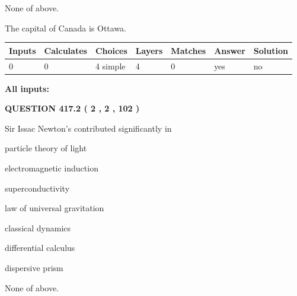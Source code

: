 \documentclass[12pt]{article}
\begin{document}
 
 None of above.
 
 
\noindent{}
 
 
The capital of Canada is Ottawa.
 
 
\noindent{}
 
 
   
   
   
   
\noindent\begin{tabular}{|l|l|l|l|l|l|l|}
 \hline
Inputs & Calculates & Choices & Layers & Matches & Answer & Solution \\ \hline
 0  & 
 0  & 
 4
  simple  
  & 
 4  & 
 0  & 
  yes & 
  no 
  \\ \hline
 \end{tabular}
   
   
   
   
\noindent{}
   
   
   
   
\noindent\vspace{0.1in}\hspace{-0.08in} {\textbf{\Large{All inputs: }}}
   
   
  
\vspace{0.2in}
  
{\textbf{\Large{QUESTION
417.2 
 ( 2 , 2 , 102 )
}}}
  
  
Sir Issac Newton's contributed significantly in
 
 
particle theory of light
 
 
electromagnetic induction
 
 
superconductivity
 
 
law of universal gravitation
 
 
classical dynamics
 
 
differential calculus
 
 
dispersive prism
 
 
 None of above.
 
\end{document}
